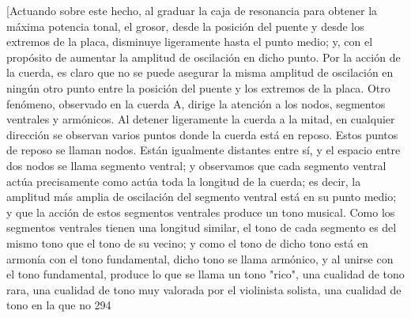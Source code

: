 [Actuando sobre este hecho, al graduar la caja de resonancia para obtener la máxima potencia tonal, el grosor, desde la posición del puente y desde los extremos de la placa, disminuye ligeramente hasta el punto medio; y, con el propósito de aumentar la amplitud de oscilación en dicho punto. Por la acción de la cuerda, es claro que no se puede asegurar la misma amplitud de oscilación en ningún otro punto entre la posición del puente y los extremos de la placa.
Otro fenómeno, observado en la cuerda A, dirige la atención a los nodos, segmentos ventrales y armónicos. Al detener ligeramente la cuerda a la mitad, en cualquier dirección se observan varios puntos donde la cuerda está en reposo. Estos puntos de reposo se llaman nodos. Están igualmente distantes entre sí, y el espacio entre dos nodos se llama segmento ventral; y observamos que cada segmento ventral actúa precisamente como actúa toda la longitud de la cuerda; es decir, la amplitud más amplia de oscilación del segmento ventral está en su punto medio; y que la acción de estos segmentos ventrales produce un tono musical. Como los segmentos ventrales tienen una longitud similar, el tono de cada segmento es del mismo tono que el tono de su vecino; y como el tono de dicho tono está en armonía con el tono fundamental, dicho tono se llama armónico, y al unirse con el tono fundamental, produce lo que se llama un tono "rico", una cualidad de tono rara, una cualidad de tono muy valorada por el violinista solista, una cualidad de tono en la que no
294

